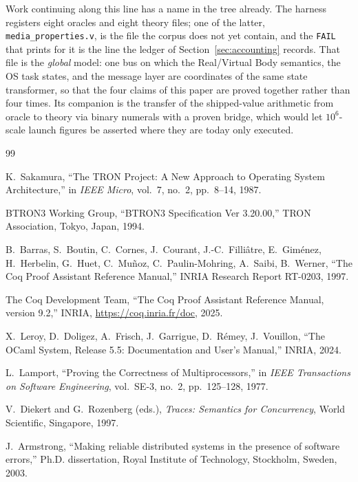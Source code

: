 \documentclass[10pt,journal,compsoc,twocolumn]{article}
\theoremstyle{definition}
\theoremstyle{remark}
\theoremstyle{plain}
\newcommand{\ctr}[1]{\texttt{#1}}
\begin{document}
Work continuing along this line has a name in the tree already. The harness registers eight oracles and eight theory files; one of the latter, \ctr{media\_properties.v}, is the file the corpus does not yet contain, and the \ctr{FAIL} that prints for it is the line the ledger of Section~\ref{sec:accounting} records. That file is the \emph{global} model: one bus on which the Real/Virtual Body semantics, the OS task states, and the message layer are coordinates of the same state transformer, so that the four claims of this paper are proved together rather than four times. Its companion is the transfer of the shipped-value arithmetic from oracle to theory via binary numerals with a proven bridge, which would let \(10^{6}\)-scale launch figures be asserted where they are today only executed.

\begin{thebibliography}{99}

K.~Sakamura, ``The TRON Project: A New Approach to Operating System Architecture,'' in \emph{IEEE Micro}, vol.~7, no.~2, pp.~8--14, 1987.

BTRON3 Working Group, ``BTRON3 Specification Ver 3.20.00,'' TRON Association, Tokyo, Japan, 1994.

B.~Barras, S.~Boutin, C.~Cornes, J.~Courant, J.-C.~Filli\^{a}tre, E.~Gim\'enez, H.~Herbelin, G.~Huet, C.~Mu\~noz, C.~Paulin-Mohring, A.~Saibi, B.~Werner, ``The Coq Proof Assistant Reference Manual,'' INRIA Research Report RT-0203, 1997.

The Coq Development Team, ``The Coq Proof Assistant Reference Manual, version 9.2,'' INRIA, \url{https://coq.inria.fr/doc}, 2025.

X.~Leroy, D.~Doligez, A.~Frisch, J.~Garrigue, D.~R\'emey, J.~Vouillon, ``The OCaml System, Release 5.5: Documentation and User's Manual,'' INRIA, 2024.

L.~Lamport, ``Proving the Correctness of Multiprocessors,'' in \emph{IEEE Transactions on Software Engineering}, vol.~SE-3, no.~2, pp.~125--128, 1977.

V.~Diekert and G.~Rozenberg (eds.), \emph{Traces: Semantics for Concurrency}, World Scientific, Singapore, 1997.

J.~Armstrong, ``Making reliable distributed systems in the presence of software errors,'' Ph.D. dissertation, Royal Institute of Technology, Stockholm, Sweden, 2003.


\end{thebibliography}
\end{document}
